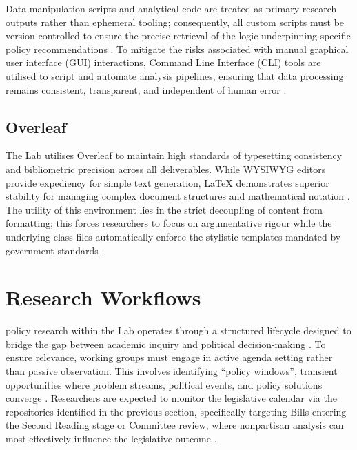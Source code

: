 \documentclass[12pt, a4paper]{article}
\begin{document}
Data manipulation scripts and analytical code are treated as primary research outputs rather than ephemeral tooling; consequently, all custom scripts must be version-controlled to ensure the precise retrieval of the logic underpinning specific policy recommendations \citep{sandve_ten_2013}. To mitigate the risks associated with manual graphical user interface (GUI) interactions, Command Line Interface (CLI) tools are utilised to script and automate analysis pipelines, ensuring that data processing remains consistent, transparent, and independent of human error \citep{wilson_good_2017}.

\subsection{Overleaf}

The Lab utilises Overleaf to maintain high standards of typesetting consistency and bibliometric precision across all deliverables. While WYSIWYG editors provide expediency for simple text generation, \LaTeX{} demonstrates superior stability for managing complex document structures and mathematical notation \citep{knauff_efficiency_2014}. The utility of this environment lies in the strict decoupling of content from formatting; this forces researchers to focus on argumentative rigour while the underlying class files automatically enforce the stylistic templates mandated by government standards \citep{knauff_efficiency_2014}.



\section{Research Workflows}
 policy research within the Lab operates through a structured lifecycle designed to bridge the gap between academic inquiry and political decision-making \citep{brownson_researchers_2006}. To ensure relevance, working groups must engage in active agenda setting rather than passive observation. This involves identifying ``policy windows'', transient opportunities where problem streams, political events, and policy solutions converge \citep{weible_theories_2023}. Researchers are expected to monitor the legislative calendar via the repositories identified in the previous section, specifically targeting Bills entering the Second Reading stage or Committee review, where nonpartisan analysis can most effectively influence the legislative outcome \citep{hird_policy_2005, birkland_introduction_2020}.
\end{document}
